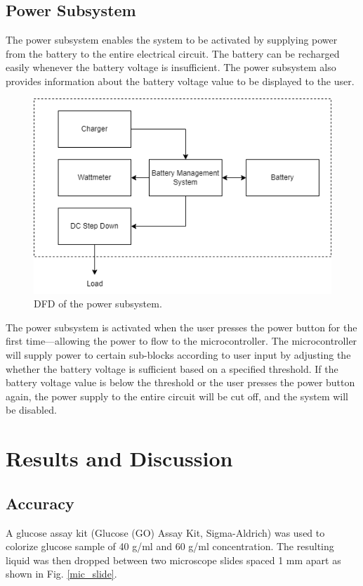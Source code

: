 \documentclass[conference]{IEEEtran}
\begin{document}
\subsection{Power Subsystem}
The power subsystem enables the system to be activated by supplying power from the battery to the entire electrical circuit. The battery can be recharged easily whenever the battery voltage is insufficient. The power subsystem also provides information about the battery voltage value to be displayed to the user. 

\begin{figure}[htbp]
    \centerline{\includegraphics[scale=0.5]{power-dfd.png}}
    \caption{DFD of the power subsystem.}
    \label{power-dfd}
    \end{figure}

The power subsystem is activated when the user presses the power button for the first time—allowing the power to flow to the microcontroller. The microcontroller will supply power to certain sub-blocks according to user input by adjusting the whether the battery voltage is sufficient based on a specified threshold. If the battery voltage value is below the threshold or the user presses the power button again, the power supply to the entire circuit will be cut off, and the system will be disabled.


\section{Results and Discussion}
\subsection{Accuracy}
A glucose assay kit (Glucose (GO) Assay Kit, Sigma-Aldrich) was used to colorize glucose sample of 40 {\textmu}g/ml and 60 {\textmu}g/ml concentration.
The resulting liquid was then dropped between two microscope slides spaced 1 mm apart as shown in Fig. \ref{mic_slide}.
\end{document}
